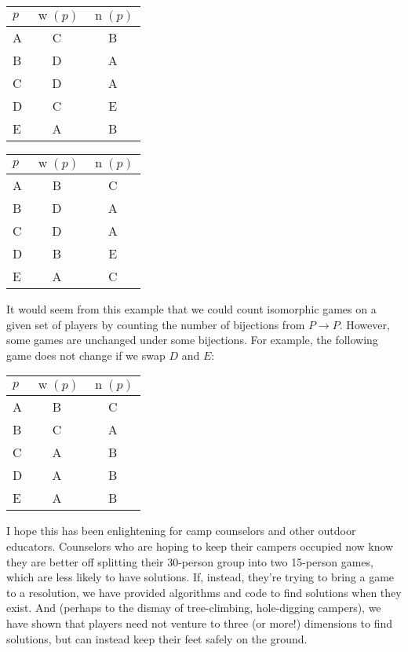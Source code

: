 \documentclass[12pt,x11names, rgb]{article}
\DeclareMathOperator{\w}{w}
\DeclareMathOperator{\n}{n}
\begin{document}
    \begin{center}
    \begin{multicols}{2}
        \begin{tabular}{l | c | c}
             $p$ & $\w(p)$ & $\n(p)$ \\
             \hline
             A &  C& B\\
             B &  D& A\\
             C &  D& A\\
             D &  C& E\\
             E &  A& B\\
        \end{tabular}


        \columnbreak
        \begin{tabular}{l | c | c}
             $p$ & $\w(p)$ & $\n(p)$ \\
             \hline
             A &  B& C\\
             B &  D& A\\
             C &  D& A\\
             D &  B& E\\
             E &  A& C\\
        \end{tabular}
    \end{multicols}
    \end{center}

    It would seem from this example that we could count isomorphic games on a given set of players by counting the number of bijections from $P\to P$. However, some games are unchanged under some bijections. For example, the following game does not change if we swap $D$ and $E$:

    \begin{center}
        \begin{tabular}{l | c | c}
             $p$ & $\w(p)$ & $\n(p)$ \\
             \hline
             A &  B& C\\
             B &  C& A\\
             C &  A& B\\
             D &  A& B\\
             E &  A& B\\
        \end{tabular}
    \end{center}

I hope this has been enlightening for camp counselors and other outdoor educators. Counselors who are hoping to keep their campers occupied now know they are better off splitting their 30-person group into two 15-person games, which are less likely to have solutions. If, instead, they're trying to bring a game to a resolution, we have provided algorithms and code to find solutions when they exist. And (perhaps to the dismay of tree-climbing, hole-digging campers), we have shown that players need not venture to three (or more!) dimensions to find solutions, but can instead keep their feet safely on the ground. 
\end{document}
